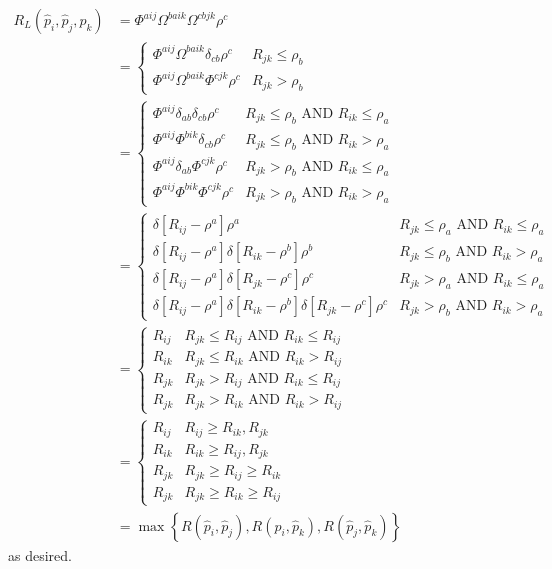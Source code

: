 \documentclass{article}
\begin{document}
\begin{align}
    R_L(\hat{p}_{i}, \hat{p}_{j}, \hat{p}_{k})  &= \Phi^{a i j} \Omega^{b a ik} \Omega^{c b jk} \rho^c \\
    &= \begin{cases}
        \Phi^{a i j} \Omega^{b a ik} \delta_{cb} \rho^c & R_{jk} \leq \rho_b \\
        \Phi^{a i j} \Omega^{b a ik} \Phi^{c jk} \rho^c & R_{jk} > \rho_b
    \end{cases} \\
    &= \begin{cases}
        \Phi^{a i j} \delta_{ab} \delta_{cb} \rho^c & R_{jk} \leq \rho_b \text{ AND } R_{ik} \leq \rho_a\\
        \Phi^{a i j} \Phi^{b ik} \delta_{cb} \rho^c & R_{jk} \leq \rho_b  \text{ AND } R_{ik} > \rho_a \\
        \Phi^{a i j} \delta_{ab} \Phi^{c jk} \rho^c & R_{jk} > \rho_b \text{ AND } R_{ik} \leq \rho_a\\
        \Phi^{a i j}  \Phi^{b ik}  \Phi^{c jk} \rho^c & R_{jk} > \rho_b  \text{ AND } R_{ik} > \rho_a
    \end{cases} \\
    &= \begin{cases}
         \delta\left[R_{ij} - \rho^a\right] \rho^a & R_{jk} \leq \rho_a \text{ AND } R_{ik} \leq \rho_a\\
         \delta\left[R_{ij} - \rho^a\right] \delta\left[R_{ik} - \rho^b\right] \rho^b & R_{jk} \leq \rho_b  \text{ AND } R_{ik} > \rho_a \\
         \delta\left[R_{ij} - \rho^a\right] \delta\left[R_{jk} - \rho^c\right] \rho^c & R_{jk} > \rho_a \text{ AND } R_{ik} \leq \rho_a\\
         \delta\left[R_{ij} - \rho^a\right]  \delta\left[R_{ik} - \rho^b\right] \delta\left[R_{jk} - \rho^c\right] \rho^c & R_{jk} > \rho_b  \text{ AND } R_{ik} > \rho_a
    \end{cases} \\
    &= \begin{cases}
        R_{ij} & R_{jk} \leq R_{ij} \text{ AND } R_{ik} \leq R_{ij} \\
        R_{ik} & R_{jk} \leq R_{ik}  \text{ AND } R_{ik} > R_{ij}  \\
        R_{jk} & R_{jk} > R_{ij} \text{ AND } R_{ik} \leq R_{ij} \\
        R_{jk} & R_{jk} > R_{ik}  \text{ AND } R_{ik} > R_{ij} 
    \end{cases} \\
    &= \begin{cases}
        R_{ij} & R_{ij} \geq R_{ik}, R_{jk} \\
        R_{ik} & R_{ik} \geq R_{ij}, R_{jk}  \\
        R_{jk} & R_{jk} \geq R_{ij} \geq R_{ik} \\
        R_{jk} & R_{jk} \geq R_{ik} \geq R_{ij} 
    \end{cases} \\
    &= \max\left\{ R(\hat{p}_{i}, \hat{p}_{j}), R(\hat{p}_{i}, \hat{p}_{k}), R(\hat{p}_{j}, \hat{p}_{k})\right\}
\end{align}
as desired.
\end{document}
